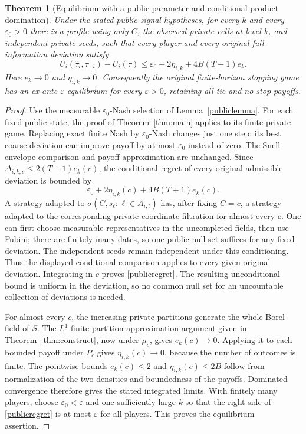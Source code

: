\documentclass[11pt]{article}
\newtheorem{theorem}{Theorem}
\theoremstyle{remark}\newtheorem{remark}[theorem]{Remark}
\begin{document}
\begin{theorem}[Equilibrium with a public parameter and conditional product domination]
\label{publictheorem}
Under the stated public-signal hypotheses, for every $k$ and every
$\varepsilon_0>0$ there is a profile using only $C$, the observed
private cells at level $k$, and independent private seeds, such that
every player and every original full-information deviation satisfy
\begin{equation}\label{publicregret}
 U_i(\widehat\tau_i,\tau_{-i})-U_i(\tau)
 \leq\varepsilon_0+2\eta_{i,k}+4B(T+1)e_k.
\end{equation}
Here $e_k\to0$ and $\eta_{i,k}\to0$. Consequently the original
finite-horizon stopping game has an ex-ante $\varepsilon$-equilibrium
for every $\varepsilon>0$, retaining all tie and no-stop payoffs.
\end{theorem}
\begin{proof}
Use the measurable $\varepsilon_0$-Nash selection of
Lemma~\ref{publiclemma}. For each fixed public state, the proof of
Theorem~\ref{thm:main} applies to its finite private game. Replacing
exact finite Nash by $\varepsilon_0$-Nash changes just one step: its
best coarse deviation can improve payoff by at most
$\varepsilon_0$ instead of zero. The Snell-envelope comparison and
payoff approximation are unchanged. Since
$\Delta_{i,k,c}\leq2(T+1)e_k(c)$, the conditional regret of every
original admissible deviation is bounded by
\[
 \varepsilon_0+2\eta_{i,k}(c)+4B(T+1)e_k(c).
\]
A strategy adapted to $\sigma(C,s_\ell:\ell\in A_{i,t})$ has,
after fixing $C=c$, a strategy adapted to the corresponding private
coordinate filtration for almost every $c$. One can first choose
measurable representatives in the uncompleted fields, then use Fubini;
there are finitely many dates, so one public null set suffices for any
fixed deviation. The independent seeds remain independent under this
conditioning. Thus the displayed conditional comparison applies to every
given original deviation. Integrating in $c$ proves
\eqref{publicregret}. The resulting unconditional bound is uniform in
the deviation, so no common null set for an uncountable collection of
deviations is needed.

For almost every $c$, the increasing private partitions generate the
whole Borel field of $S$. The $L^1$ finite-partition approximation
argument given in Theorem~\ref{thm:construct}, now under $\mu_c$,
gives $e_k(c)\to0$. Applying it to each bounded payoff under $P_c$
gives $\eta_{i,k}(c)\to0$, because the number of outcomes is finite.
The pointwise bounds $e_k(c)\leq2$ and
$\eta_{i,k}(c)\leq2B$ follow from normalization of the two densities
and boundedness of the payoffs. Dominated convergence therefore gives
the stated integrated limits. With finitely many players, choose
$\varepsilon_0<\varepsilon$ and one sufficiently large $k$ so that
the right side of \eqref{publicregret} is at most $\varepsilon$ for
all players. This proves the equilibrium assertion.
\end{proof}
\end{document}
